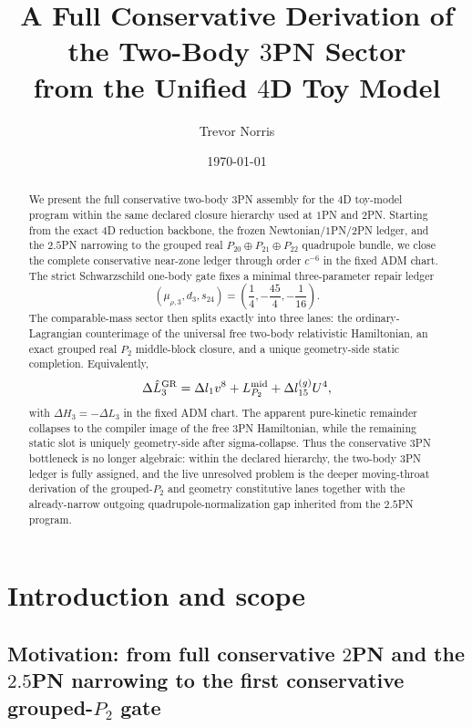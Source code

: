 \documentclass[11pt]{article}
\title{A Full Conservative Derivation of the Two-Body $3$PN Sector\\from the Unified $4$D Toy Model}
\author{Trevor Norris}
\date{\today}
\begin{document}
\maketitle

\begin{abstract}
We present the full conservative two-body $3$PN assembly for the $4$D toy-model program within the same declared closure hierarchy used at $1$PN and $2$PN. Starting from the exact $4$D reduction backbone, the frozen Newtonian/$1$PN/$2$PN ledger, and the $2.5$PN narrowing to the grouped real $P_{20}\oplus P_{21}\oplus P_{22}$ quadrupole bundle, we close the complete conservative near-zone ledger through order $c^{-6}$ in the fixed ADM chart. The strict Schwarzschild one-body gate fixes a minimal three-parameter repair ledger
\[
(\mu_{\rho,3},d_3,s_{24})=\left(\frac14,-\frac{45}{4},-\frac1{16}\right).
\]
The comparable-mass sector then splits exactly into three lanes: the ordinary-Lagrangian counterimage of the universal free two-body relativistic Hamiltonian, an exact grouped real $P_2$ middle-block closure, and a unique geometry-side static completion. Equivalently,
\[
\Delta \hat L_3^{\rm GR}
=
\Delta l_1 v^8
+
L_{P_2}^{\rm mid}
+
\Delta l_{15}^{(g)}U^4,
\]
with $\Delta H_3=-\Delta L_3$ in the fixed ADM chart. The apparent pure-kinetic remainder collapses to the compiler image of the free $3$PN Hamiltonian, while the remaining static slot is uniquely geometry-side after sigma-collapse. Thus the conservative $3$PN bottleneck is no longer algebraic: within the declared hierarchy, the two-body $3$PN ledger is fully assigned, and the live unresolved problem is the deeper moving-throat derivation of the grouped-$P_2$ and geometry constitutive lanes together with the already-narrow outgoing quadrupole-normalization gap inherited from the $2.5$PN program.
\end{abstract}


\section{Introduction and scope}
\label{sec:intro}

\subsection{Motivation: from full conservative \texorpdfstring{$2$}{2}PN and the \texorpdfstring{$2.5$}{2.5}PN narrowing to the first conservative grouped-\texorpdfstring{$P_2$}{P 2} gate}
\label{sec:intro-motivation}
\end{document}

